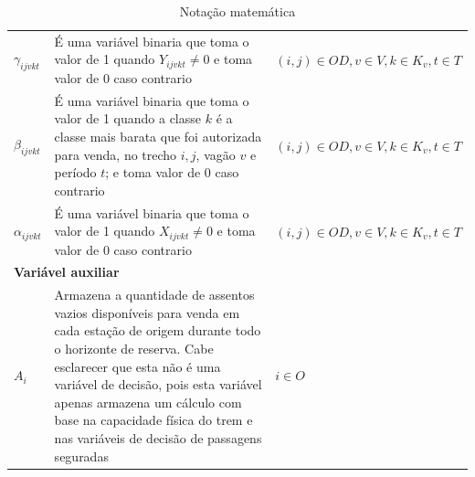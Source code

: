 \begin{table}[H]
\begin{tabular}{p{2cm} p{9.5cm} p{3.2cm}}
		$\gamma_{ijvkt}$       & É uma variável binaria que toma o valor de 1 quando $Y_{ijvkt} \neq 0$ e toma  valor de 0 caso contrario                                                                                                                                                                                                                                                                                                                      & $(i,j) \in OD, v \in V, k \in K_v, t \in T$ \\
		$\beta_{ijvkt}$       & É uma variável binaria que toma o valor de 1 quando a classe $k$ é a classe mais barata que foi autorizada para venda, no trecho $i,j$, vagão $v$ e período $t$; e toma  valor de 0 caso contrario                                                                                                                                                                                                                                                                    & $(i,j) \in OD, v \in V, k \in K_v, t \in T$  \\
		$\alpha_{ijvkt}$       & É uma variável binaria que toma o valor de 1 quando $X_{ijvkt} \neq 0$ e toma  valor de 0 caso contrario                                                                                                                                                                                                                                                                                                                      & $(i,j) \in OD, v \in V, k \in K_v, t \in T$ \\
		\multicolumn{3}{l}{\textbf{Variável auxiliar}}                                                                                                                                                                                                                                                                                                                                                                                                                                                    \\ \midrule
		$A_{i}$            & Armazena a quantidade de assentos vazios disponíveis para venda em cada estação de origem durante todo o horizonte de reserva. Cabe esclarecer que esta não é uma variável de decisão, pois esta variável apenas armazena um cálculo com base na capacidade física do trem e nas variáveis de decisão de passagens seguradas                                                                                                          & $i \in O$                                    \\
		\bottomrule
	\end{tabular}
	\caption{Notação matemática}
	\label{tab: m1_definicao2}
\end{table}

